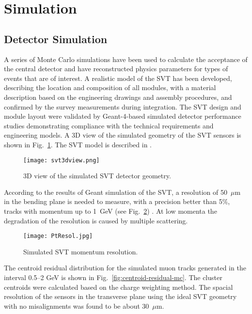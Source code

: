\section{Simulation}

\subsection{Detector Simulation}

A series of Monte Carlo simulations have been used to calculate the acceptance of the central detector and have reconstructed physics parameters for types of events that are of interest. A realistic model of the SVT has been developed, describing the location and composition of all modules, with a material description based on the engineering drawings and assembly procedures, and confirmed by the survey measurements during integration. The SVT design and module layout were validated by Geant-4-based simulated detector performance studies demonstrating compliance with the technical requirements and engineering models. A 3D view of the simulated geometry of the SVT sensors is shown in Fig.~\ref{fig:svt3dview}. The SVT model is described in \cite{MCNIM}. 

\begin{figure}[hbt] 
\centering 
\texttt{[image: svt3dview.png]}
\caption{3D view of the simulated SVT detector geometry.}
\label{fig:svt3dview}
\end{figure}

According to the results of Geant simulation of the SVT, a resolution of 50~$\mu$m in the bending plane is needed to measure, with a precision better than 5$\%$, tracks with momentum up to 1~GeV (see Fig.~\ref{fig:PtRes}) \cite{MC1,MC2}. At low momenta the degradation of the resolution is caused by multiple scattering.

\begin{figure}[hbt]
\texttt{[image: PtResol.jpg]}
\caption{Simulated SVT momentum resolution.}
\label{fig:PtRes}
\end{figure}

The centroid residual distribution for the simulated muon tracks generated in the interval 0.5--2 GeV is shown in Fig.~\ref{fig:centroid-residual-mc}. The cluster centroids were calculated based on the charge weighting method. The spacial resolution of the sensors in the transverse plane using the ideal SVT geometry with no misalignments was found to be about 30~$\mu$m. 

